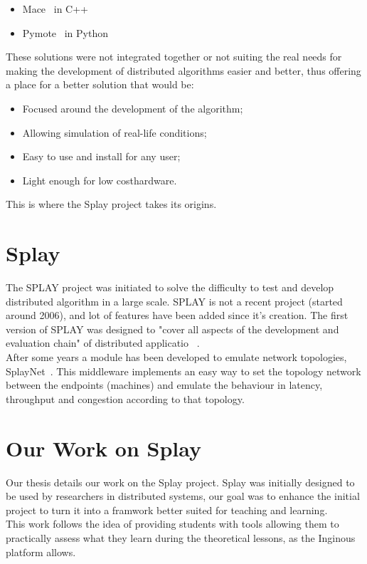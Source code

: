 \documentclass{eplmastersthesis}
\begin{document}
      \begin{itemize}
        \item Mace~\cite{Mace} in C++
        \item Pymote~\cite{Pymote} in Python
      \end{itemize}

      These solutions were not integrated together or not suiting the real needs
      for making the development of distributed algorithms easier and better,
      thus offering a place for a better solution that would be:

      \begin{itemize}
        \item Focused around the development of the algorithm;
        \item Allowing simulation of real-life conditions;
        \item Easy to use and install for any user;
        \item Light enough for low costhardware.
      \end{itemize}

      This is where the Splay project takes its origins.

    \section{Splay}

      The SPLAY project was initiated to solve the difficulty to test and
      develop distributed algorithm in a large scale. SPLAY is not a recent
      project (started around 2006), and lot of features have been added since
      it's creation. The first version of SPLAY was designed to "cover all
      aspects of the development and evaluation chain" of distributed
      applicatio~ \cite{SPLAY}. \\

      After some years a module has been developed to emulate network
      topologies, SplayNet~\cite{SplayNet}. This middleware implements an easy
      way to set the topology network between the endpoints (machines) and
      emulate the behaviour in latency, throughput and congestion according
      to that topology.

    \section{Our Work on Splay}

      Our thesis details our work on the Splay project. Splay was initially
      designed to be used by researchers in distributed systems, our goal
      was to enhance the initial project to turn it into a framwork
      better suited for teaching and learning.\\
      This work follows the idea of providing students with tools
      allowing them to practically assess what they learn during the
      theoretical lessons, as the Inginous~\cite{inginious} platform allows.\\
\end{document}
